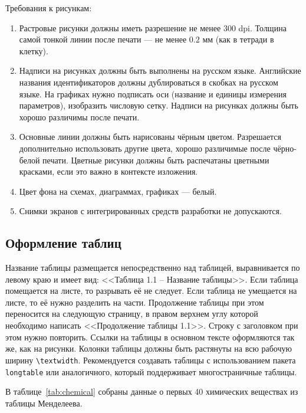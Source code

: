 \documentclass[14pt]{extarticle}
\begin{document}
Требования к рисункам:
\begin{enumerate}[label=\arabic*., wide]
\item Растровые рисунки должны иметь разрешение не менее 300 dpi. Толщина самой тонкой линии после печати --- не менее $0.2$ мм (как в тетради в клетку).
\item Надписи на рисунках должны быть выполнены на русском языке. Английские названия идентификаторов должны дублироваться в скобках на русском языке. На графиках нужно подписать оси (название и единицы измерения параметров), изобразить числовую сетку. Надписи на рисунках должны быть хорошо различимы после печати.
\item Основные линии должны быть нарисованы чёрным цветом. Разрешается дополнительно использовать другие цвета, хорошо различимые после чёрно-белой печати. Цветные рисунки должны быть распечатаны цветными красками, если это важно в контексте изложения. 
\item Цвет фона на схемах, диаграммах, графиках --- белый.
\item Снимки экранов с интегрированных средств разработки не допускаются.
\end{enumerate}


\subsection{Оформление таблиц}
Название таблицы размещается непосредственно над таблицей, выравнивается по левому краю и имеет вид: <<Таблица 1.1 -- Название таблицы>>. 
Если таблица помещается на листе, то разрывать её не следует. Если таблица не умещается на листе, то её нужно разделить на части. Продолжение таблицы при этом переносится на следующую страницу, в правом верхнем углу которой необходимо написать <<Продолжение таблицы 1.1>>. Строку с заголовком при этом нужно повторить.
Ссылки на таблицы в основном тексте оформляются так же, как на рисунки.
Колонки таблицы должны быть растянуты на всю рабочую ширину \texttt{\textbackslash textwidth}. Рекомендуется создавать таблицы с использованием пакета \texttt{longtable} или аналогичного, который поддерживает многостраничные таблицы.

\begin{tcolorbox}[title={Пример текста со ссылкой на таблицу}]
\par В таблице~\ref{tab:chemical} собраны данные о первых 40 химических веществах из таблицы Менделеева.
\end{tcolorbox}
\end{document}
